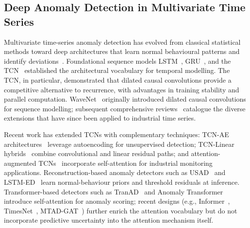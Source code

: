 
\subsection{Deep Anomaly Detection in Multivariate Time Series}

Multivariate time-series anomaly detection has evolved from classical statistical methods toward deep architectures that learn normal behavioural patterns and identify deviations~\cite{pang2021deep_survey}. Foundational sequence models LSTM~\cite{hochreiter1997lstm}, GRU~\cite{cho2014gru}, and the TCN~\cite{bai2018tcn} established the architectural vocabulary for temporal modelling. The TCN, in particular, demonstrated that dilated causal convolutions provide a competitive alternative to recurrence, with advantages in training stability and parallel computation. WaveNet~\cite{oord2016wavenet} originally introduced dilated causal convolutions for sequence modelling; subsequent comprehensive reviews~\cite{zhang2020tcn_review} catalogue the diverse extensions that have since been applied to industrial time series.

Recent work has extended TCNs with complementary techniques: TCN-AE architectures~\cite{thill_temporal_2021} leverage autoencoding for unsupervised detection; TCN-Linear hybrids~\cite{wang_tcn-linear_2024} combine convolutional and linear residual paths; and attention-augmented TCNs~\cite{mehta_nac-tcn_2023} incorporate self-attention for industrial monitoring applications. Reconstruction-based anomaly detectors such as USAD~\cite{audibert2020usad} and LSTM-ED~\cite{malhotra2016lstmed} learn normal-behaviour priors and threshold residuals at inference. Transformer-based detectors such as TranAD~\cite{tuli2022tranad} and Anomaly Transformer~\cite{xu2022anomalytransformer} introduce self-attention for anomaly scoring; recent designs (e.g., Informer~\cite{zhou2021informer}, TimesNet~\cite{wu2022timesnet}, MTAD-GAT~\cite{zhao2020mtadgat}) further enrich the attention vocabulary but do not incorporate predictive uncertainty into the attention mechanism itself.


